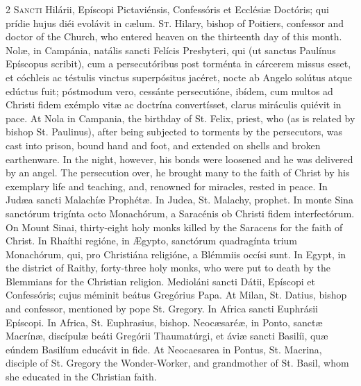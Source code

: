\begin{paracol}{2}
\lettrine[lines=2]{S}{ancti} Hilárii, Epíscopi Pictaviénsis, Confessóris et Ecclésiæ 
 Doctóris; qui prídie hujus diéi evolávit in cælum.
\switchcolumn
{}
\lettrine[lines=2]{S}{t.} Hilary, bishop of Poitiers, confessor and doctor of the Church, who 
 entered heaven on the thirteenth day of this month.
\switchcolumn*
{}
Nolæ, in Campánia, natális sancti Felícis 
 Presbyteri, qui (ut sanctus Paulínus Epíscopus scribit), cum a 
 persecutóribus post torménta in cárcerem missus esset, et cóchleis ac 
 téstulis vinctus superpósitus jacéret, nocte ab Angelo solútus atque edúctus 
 fuit; póstmodum vero, cessánte persecutióne, ibídem, cum multos ad Christi 
 fidem exémplo vitæ ac doctrína convertísset, clarus miráculis quiévit in 
 pace.
\switchcolumn
{}
At Nola in Campania, the birthday of St. Felix, priest, who (as is related 
 by bishop St. Paulinus), after being subjected to torments by the 
 persecutors, was cast into prison, bound hand and foot, and extended on 
 shells and broken earthenware. In the night, however, his bonds were 
 loosened and he was delivered by an angel. The persecution over, he 
 brought many to the faith of Christ by his exemplary life and teaching, and, 
 renowned for miracles, rested in peace.
\switchcolumn*
{}
In Judæa sancti Malachíæ Prophétæ.
\switchcolumn
{}
In Judea, St. Malachy, prophet.
\switchcolumn*
{}
In monte Sina sanctórum trigínta octo Monachórum, a Saracénis ob Christi 
 fidem interfectórum.
\switchcolumn
{}
On Mount Sinai, thirty-eight holy monks killed by the Saracens for the faith 
 of Christ.
\switchcolumn*
{}
In Rhaíthi regióne, in Ægypto, sanctórum 
 quadragínta trium Monachórum, qui, pro Christiána religióne, a Blémmiis 
 occísi sunt.
\switchcolumn
{}
In Egypt, in the district of Raithy, forty-three holy monks, who were put to 
 death by the Blemmians for the Christian religion.
\switchcolumn*
{}
Medioláni sancti Dátii, Epíscopi et Confessóris; cujus méminit beátus 
 Gregórius Papa.
\switchcolumn
{}
At Milan, St. Datius, bishop and confessor, mentioned by pope St. Gregory.
\switchcolumn*
{}
In Africa sancti Euphrásii Epíscopi.
\switchcolumn
{}
In Africa, St. Euphrasius, bishop.
\switchcolumn*
{}
Neocæsaréæ, in Ponto, sanctæ Macrínæ, discípulæ 
 beáti Gregórii Thaumatúrgi, et áviæ sancti Basilíi, quæ eúndem Basilíum 
 educávit in fide.
\switchcolumn
{}
At Neocaesarea in Pontus, St. Macrina, disciple of St. Gregory the 
 Wonder-Worker, and grandmother of St. Basil, whom she educated in the 
 Christian faith.
\switchcolumn*
{}
\end{paracol}



